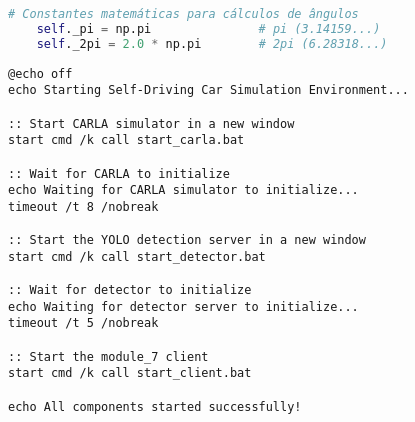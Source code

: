 \documentclass[
	12pt,				%
	oneside, %
	a4paper,			%
	english,			%
	french,				%
	spanish,			%
	brazil				%
	]{abntex2}
\begin{document}
\begin{apendicesenv}
\begin{lstlisting}[language=Python, caption=Construtor da classe Controller2D., label=lst:controller-init]
    # Constantes matemáticas para cálculos de ângulos
    self._pi = np.pi               # pi (3.14159...)
    self._2pi = 2.0 * np.pi        # 2pi (6.28318...)
\end{lstlisting}


\begin{lstlisting}[style=cmdstyle, caption={\textit{Script} de inicialização completa do sistema.}, label={lst:start_all}]
@echo off
echo Starting Self-Driving Car Simulation Environment...

:: Start CARLA simulator in a new window
start cmd /k call start_carla.bat

:: Wait for CARLA to initialize
echo Waiting for CARLA simulator to initialize...
timeout /t 8 /nobreak

:: Start the YOLO detection server in a new window
start cmd /k call start_detector.bat

:: Wait for detector to initialize
echo Waiting for detector server to initialize...
timeout /t 5 /nobreak

:: Start the module_7 client
start cmd /k call start_client.bat

echo All components started successfully!
\end{lstlisting}



\end{apendicesenv}



\end{document}
